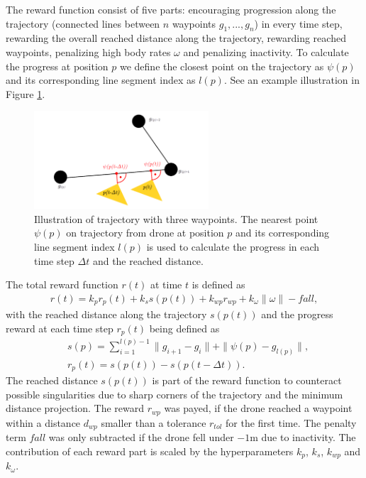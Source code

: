 The reward function consist of five parts: encouraging progression along the trajectory (connected lines between $n$ waypoints $g_1,...,g_n$) in every time step, rewarding the overall reached distance along the trajectory, rewarding reached waypoints, penalizing high body rates $\omega$ and penalizing inactivity. To calculate the progress at position $p$ we define the closest point on the trajectory as $\psi(p)$ and its corresponding line segment index as $l(p)$. See an example illustration in Figure \ref{fig:trajectory}.
\begin{figure}[b]
    \centering
    \includegraphics[width=6.5cm]{images/trajectory.png}
    \caption{Illustration of trajectory with three waypoints. The nearest point $\psi(p)$ on trajectory from drone at position $p$ and its corresponding line segment index $l(p)$ is used to calculate the progress in each time step $\Delta t$ and the reached distance.}
    \label{fig:trajectory}
\end{figure}
The total reward function $r(t)$ at time $t$ is defined as 
\begin{align*}
r(t) = k_p r_p(t) + k_s s(p(t)) + k_{wp} r_{wp} + k_\omega \|\omega\| - fall,
\end{align*}
with the reached distance along the trajectory $s(p(t))$ and the progress reward at each time step $r_p(t)$ being defined as
\begin{align*}
    &s(p) = \sum_{i=1}^{l(p) - 1} \| g_{i+1} - g_i \| + \|\psi(p) - g_{l(p)}\|, \\
    &r_p(t) = s(p(t))-s(p(t- \Delta t)).
\end{align*}
The reached distance $s(p(t))$ is part of the reward function to counteract possible singularities due to sharp corners of the trajectory and the minimum distance projection. The reward $r_{wp}$ was payed, if the drone reached a waypoint within a distance $d_{wp}$ smaller than a tolerance $r_{tol}$ for the first time. The penalty term $fall$ was only subtracted if the drone fell under $-1$m due to inactivity. The contribution of each reward part is scaled by the hyperparameters $k_p$, $k_s$, $k_{wp}$ and $k_{\omega}$.

